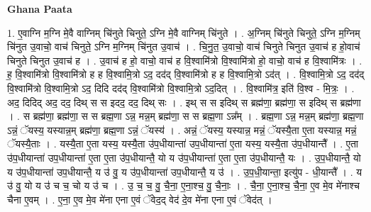 \documentclass[17pt]{extarticle}
\begin{document}
\textbf{Ghana Paata } \newline

1. ए॒वाग्नि म॒ग्नि मे॒वै वाग्निम् चि॑नुते चिनुते॒ ऽग्नि मे॒वै वाग्निम् चि॑नुते । . अ॒ग्निम् चि॑नुते चिनुते॒ ऽग्नि म॒ग्निम् चि॑नुत उ॒वाचो॒ वाच॑ चिनुते॒ ऽग्नि म॒ग्निम् चि॑नुत उ॒वाच॑ । . चि॒नु॒त॒ उ॒वाचो॒ वाच॑ चिनुते चिनुत उ॒वाच॑ ह हो॒वाच॑ चिनुते चिनुत उ॒वाच॑ ह । . उ॒वाच॑ ह हो॒ वाचो॒ वाच॑ ह वि॒श्वामि॑त्रो वि॒श्वामि॑त्रो हो॒ वाचो॒ वाच॑ ह वि॒श्वामि॑त्रः । . ह॒ वि॒श्वामि॑त्रो वि॒श्वामि॑त्रो ह ह वि॒श्वामि॒त्रो ऽद॒ दद॑द् वि॒श्वामि॑त्रो ह ह वि॒श्वामि॒त्रो ऽद॑त् । . वि॒श्वामि॒त्रो ऽद॒ दद॑द् वि॒श्वामि॑त्रो वि॒श्वामि॒त्रो ऽद॒ दिदि दद॑द् वि॒श्वामि॑त्रो वि॒श्वामि॒त्रो ऽद॒दित् । . वि॒श्वामि॑त्र॒ इति॑ वि॒श्व - मि॒त्रः॒ । . अद॒ दिदिद् अद॒ दद॒ दिथ् स स इदद॒ दद॒ दिथ् सः । . इथ् स स इदिथ् स ब्रह्म॑णा॒ ब्रह्म॑णा॒ स इदिथ् स ब्रह्म॑णा । . स ब्रह्म॑णा॒ ब्रह्म॑णा॒ स स ब्रह्म॒णा ऽन्न॒ मन्न॒म् ब्रह्म॑णा॒ स स ब्रह्म॒णा ऽन्न᳚म् । . ब्रह्म॒णा ऽन्न॒ मन्न॒म् ब्रह्म॑णा॒ ब्रह्म॒णा ऽन्नं॒ ॅयस्य॒ यस्यान्न॒म् ब्रह्म॑णा॒ ब्रह्म॒णा ऽन्नं॒ ॅयस्य॑ । . अन्नं॒ ॅयस्य॒ यस्यान्न॒ मन्नं॒ ॅयस्यै॒ता ए॒ता यस्यान्न॒ मन्नं॒ ॅयस्यै॒ताः । . यस्यै॒ता ए॒ता यस्य॒ यस्यै॒ता उ॑प॒धीयान्ता॑ उप॒धीयान्ता॑ ए॒ता यस्य॒ यस्यै॒ता उ॑प॒धीयान्तै᳚ । . ए॒ता उ॑प॒धीयान्ता॑ उप॒धीयान्ता॑ ए॒ता ए॒ता उ॑प॒धीयान्तै॒ यो य उ॑प॒धीयान्ता॑ ए॒ता ए॒ता उ॑प॒धीयान्तै॒ यः । . उ॒प॒धीयान्तै॒ यो य उ॑प॒धीयान्ता॑ उप॒धीयान्तै॒ य उ॑ वु॒ य उ॑प॒धीयान्ता॑ उप॒धीयान्तै॒ य उ॑ । . उ॒प॒धी॒यान्ता॒ इत्यु॑प - धी॒यान्तै᳚ । . य उ॑ वु॒ यो य उ॑ च च॒ चो य उ॑ च । . उ॒ च॒ च॒ वु॒ चै॒ना॒ ए॒ना॒श्च॒ वु॒ चै॒नाः॒ । . चै॒ना॒ ए॒ना॒श्च॒ चै॒ना॒ ए॒व मे॒व मे॑नाश्च चैना ए॒वम् । . ए॒ना॒ ए॒व मे॒व मे॑ना एना ए॒वं ॅवेद॒द् वेद॑ दे॒व मे॑ना एना ए॒वं ॅवेद॑त् । \newline
\end{document}
